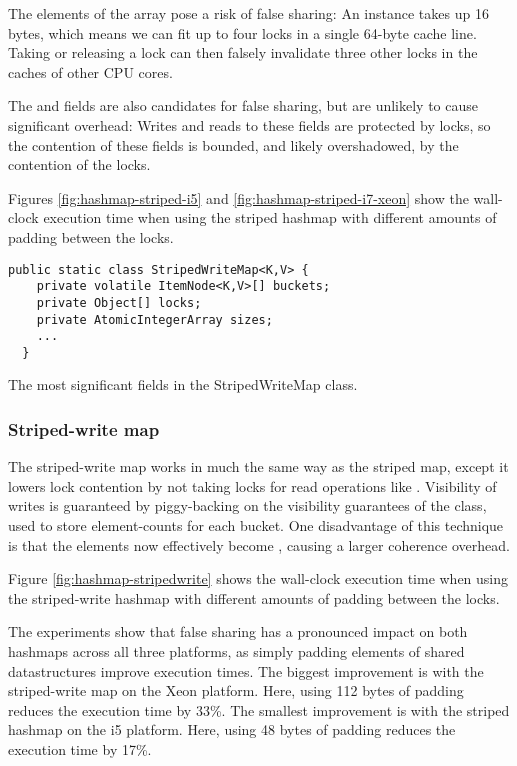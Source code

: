 The elements of the  array pose a risk of false sharing: An
 instance takes up 16 bytes\footnotemark, which means we can fit
up to four locks in a single 64-byte cache line. Taking or releasing a lock can
then falsely invalidate three other locks in the caches of other CPU cores.

The  and  fields are also candidates for false
sharing, but are unlikely to cause significant overhead: Writes and reads to
these fields are protected by locks, so the contention of these fields is
bounded, and likely overshadowed, by the contention of the locks.


Figures \ref{fig:hashmap-striped-i5} and \ref{fig:hashmap-striped-i7-xeon} show
the wall-clock execution time when using the striped hashmap with different
amounts of padding between the locks.

\begin{code}
\begin{Verbatim}[frame=single]
  public static class StripedWriteMap<K,V> {
    private volatile ItemNode<K,V>[] buckets;
    private Object[] locks;
    private AtomicIntegerArray sizes;
    ...
  }
\end{Verbatim}
	\caption{The most significant fields in the StripedWriteMap class.}
\end{code}

\subsubsection{Striped-write map}
The striped-write map works in much the same way as the striped map, except it
lowers lock contention by not taking locks for read operations like .
Visibility of writes is guaranteed by piggy-backing on the visibility
guarantees of the  class, used to store element-counts
for each bucket. One disadvantage of this technique is that the 
elements now effectively become , causing a larger coherence
overhead.

Figure \ref{fig:hashmap-stripedwrite} shows the wall-clock execution time when
using the striped-write hashmap with different amounts of padding between the locks.

The experiments show that false sharing has a pronounced impact on both hashmaps
across all three platforms, as simply padding elements of shared datastructures
improve execution times.
The biggest improvement is with the striped-write map on the Xeon platform.
Here, using 112 bytes of padding reduces the execution time by 33\%. The
smallest improvement is with the striped hashmap on the i5 platform. Here, using
48 bytes of padding reduces the execution time by 17\%.

